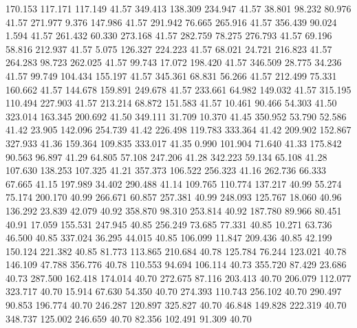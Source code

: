  170.153  117.171  117.149        41.57
 349.413  138.309  234.947        41.57
  38.801   98.232   80.976        41.57
 271.977    9.376  147.986        41.57
 291.942   76.665  265.916        41.57
 356.439   90.024    1.594        41.57
 261.432   60.330  273.168        41.57
 282.759   78.275  276.793        41.57
  69.196   58.816  212.937        41.57
   5.075  126.327  224.223        41.57
  68.021   24.721  216.823        41.57
 264.283   98.723  262.025        41.57
  99.743   17.072  198.420        41.57
 346.509   28.775   34.236        41.57
  99.749  104.434  155.197        41.57
 345.361   68.831   56.266        41.57
 212.499   75.331  160.662        41.57
 144.678  159.891  249.678        41.57
 233.661   64.982  149.032        41.57
 315.195  110.494  227.903        41.57
 213.214   68.872  151.583        41.57
  10.461   90.466   54.303        41.50
 323.014  163.345  200.692        41.50
 349.111   31.709   10.370        41.45
 350.952   53.790   52.586        41.42
  23.905  142.096  254.739        41.42
 226.498  119.783  333.364        41.42
 209.902  152.867  327.933        41.36
 159.364  109.835  333.017        41.35
   0.990  101.904   71.640        41.33
 175.842   90.563   96.897        41.29
  64.805   57.108  247.206        41.28
 342.223   59.134   65.108        41.28
 107.630  138.253  107.325        41.21
 357.373  106.522  256.323        41.16
 262.736   66.333   67.665        41.15
 197.989   34.402  290.488        41.14
 109.765  110.774  137.217        40.99
  55.274   75.174  200.170        40.99
 266.671   60.857  257.381        40.99
 248.093  125.767   18.060        40.96
 136.292   23.839   42.079        40.92
 358.870   98.310  253.814        40.92
 187.780   89.966   80.451        40.91
  17.059  155.531  247.945        40.85
 256.249   73.685   77.331        40.85
  10.271   63.736   46.500        40.85
 337.024   36.295   44.015        40.85
 106.099   11.847  209.436        40.85
  42.199  150.124  221.382        40.85
  81.773  113.865  210.684        40.78
 125.784   76.244  123.021        40.78
 146.109   47.788  356.776        40.78
 110.553   94.694  106.114        40.73
 355.720   87.429   23.686        40.73
 287.500  162.418  174.014        40.70
 272.675   87.116  203.413        40.70
 206.079  112.077  323.717        40.70
  15.914   67.630   54.350        40.70
 274.393  110.743  256.102        40.70
 290.497   90.853  196.774        40.70
 246.287  120.897  325.827        40.70
  46.848  149.828  222.319        40.70
 348.737  125.002  246.659        40.70
  82.356  102.491   91.309        40.70
